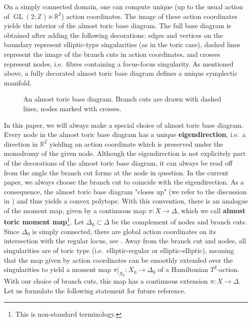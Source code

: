 \documentclass[12pt,a4paper,abstract=true,draft]{scrartcl}
\begin{document}
On a simply connected domain, one can compute unique (up to the usual action of $\operatorname{GL}(2;\mathbb{Z}) \ltimes \mathbb{R}^2$) action coordinates.
The image of these action coordinates yields the interior of the almost toric base diagram.
The full base diagram is obtained after adding the following decorations: edges and vertices on the boundary represent elliptic-type singularities (as in the toric case), dashed lines represent the image of the branch cuts in action coordinates, and crosses represent nodes, i.e.\ fibres containing a focus-focus singularity.
As mentioned above, a fully decorated almost toric base diagram defines a unique symplectic manifold.

\begin{figure}
  \centering
  \caption{An almost toric base diagram.
Branch cuts are drawn with dashed lines, nodes marked with crosses.}
  \label{fig:atf_example}
\end{figure}

In this paper, we will always make a special choice of almost toric base diagram.
Every node in the almost toric base diagram has a unique \textbf{eigendirection}, i.e.\ a direction in $\mathbb{R}^2$ yielding an action coordinate which is preserved under the monodromy of the given node.
Although the eigendirection is not explicitely part of the decorations of the almost toric base diagram, it can always be read off from the angle the branch cut forms at the node in question.
In the current paper, we always choose the branch cut to coincide with the eigendirection.
As a consequence, the almost toric base diagram "closes up" (we refer to the discussion in \cite[Section 7.2]{evans2021atfs}) and thus yields a convex polytope.
With this convention, there is an analogue of the moment map, given by a continuous map $\pi \colon X \rightarrow \Delta$, which we call \textbf{almost toric moment map}\footnote{This is non-standard terminology.}.
Let $\Delta_0 \subset \Delta$ be the complement of nodes and branch cuts.
Since $\Delta_0$ is simply connected, there are global action coordinates on its intersection with the regular locus, see \cite{Dui80}.
Away from the branch cut and nodes, all singularities are of toric type (i.e.\ elliptic-regular or elliptic-elliptic), meaning that the map given by action coordinates can be smoothly extended over the singularities to yield a moment map $\pi\vert_{X_0} \colon X_0 \rightarrow \Delta_0$ of a Hamiltonian $T^2$-action.
With our choice of branch cuts, this map has a continuous extension $\pi \colon X \rightarrow \Delta$.
Let us formulate the following statement for future reference.
\end{document}

